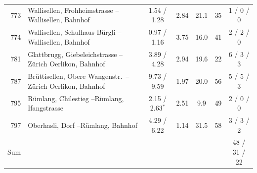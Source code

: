 \documentclass[11pt,a4paper]{article}
\theoremstyle{plain}
\theoremstyle{definition}
\theoremstyle{remark}
\begin{document}
\begin{table}[htbp]
\begin{tabularx}{\linewidth}{@{}r>{\hsize=1.000\hsize\raggedright\arraybackslash}Xccccc@{}}
773 & Wallisellen, Frohheimstrasse --\newline Wallisellen, Bahnhof & 1.54 / 1.28 & 2.84 & 21.1 & 35 & 1 / 0 / 0 \\
774 & Wallisellen, Schulhaus B\"urgli --\newline Wallisellen, Bahnhof & 0.97 / 1.16 & 3.75 & 16.0 & 41 & 2 / 2 / 0 \\
781 & Glattbrugg, Giebeleichstrasse --\newline Z\"urich Oerlikon, Bahnhof & 3.89 / 4.28 & 2.94 & 19.6 & 22 & 6 / 3 / 3 \\
787 & Br\"uttisellen, Obere Wangenstr.\ --\newline Z\"urich Oerlikon, Bahnhof & 9.73 / 9.59 & 1.97 & 20.0 & 56 & 5 / 5 / 3 \\
795 & R\"umlang, Chilestieg --\newline R\"umlang, Ifangstrasse & 2.15 / 2.63$^{*}$ & 2.51 & 9.9 & 49 & 2 / 0 / 0 \\
797 & Oberhasli, Dorf --\newline R\"umlang, Bahnhof & 4.29 / 6.22 & 1.14 & 31.5 & 58 & 3 / 3 / 2 \\
\midrule
Sum & & & & & & 48 / 31 / 22 \\
\bottomrule
\end{tabularx}
\end{table}
\end{document}
